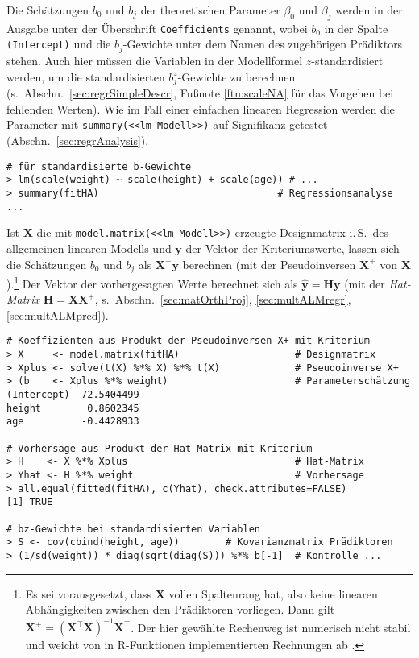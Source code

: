 Die Schätzungen $b_{0}$ und $b_{j}$ der theoretischen Parameter $\beta_{0}$ und $\beta_{j}$ werden in der Ausgabe unter der Überschrift \lstinline!Coefficients! genannt, wobei $b_{0}$ in der Spalte \lstinline!(Intercept)! und die $b_{j}$-Gewichte unter dem Namen des zugehörigen Prädiktors stehen. Auch hier müssen die Variablen in der Modellformel $z$-standardisiert werden, um die standardisierten $b_{j}^{z}$-Gewichte zu berechnen (s.\ Abschn.\ \ref{sec:regrSimpleDescr}, Fußnote \ref{ftn:scaleNA} für das Vorgehen bei fehlenden Werten). Wie im Fall einer einfachen linearen Regression werden die Parameter mit \lstinline!summary(<<lm-Modell>>)! auf Signifikanz getestet (Abschn.\ \ref{sec:regrAnalysis}).
\begin{lstlisting}
# für standardisierte b-Gewichte
> lm(scale(weight) ~ scale(height) + scale(age)) # ...
> summary(fitHA)                               # Regressionsanalyse ...
\end{lstlisting}

Ist $\bm{X}$ die mit \lstinline!model.matrix(<<lm-Modell>>)! erzeugte Designmatrix i.\,S.\ des allgemeinen linearen Modells und $\bm{y}$ der Vektor der Kriteriumswerte, lassen sich die Schätzungen $b_{0}$ und $b_{j}$ als $\bm{X}^{+} \bm{y}$ berechnen (mit der Pseudoinversen $\bm{X}^{+}$ von $\bm{X}$).\footnote{Es sei vorausgesetzt, dass $\bm{X}$ vollen Spaltenrang hat, also keine linearen Abhängigkeiten zwischen den Prädiktoren vorliegen. Dann gilt $\bm{X}^{+} = (\bm{X}^{\top} \bm{X})^{-1} \bm{X}^{\top}$. Der hier gewählte Rechenweg ist numerisch nicht stabil und weicht von in R-Funktionen implementierten Rechnungen ab \cite{Bates2004}.} Der Vektor der vorhergesagten Werte berechnet sich als $\hat{\bm{y}} = \bm{H} \bm{y}$ (mit der \emph{Hat-Matrix} $\bm{H} = \bm{X} \bm{X}^{+}$, s.\ Abschn.\ \ref{sec:matOrthProj}, \ref{sec:multALMregr}, \ref{sec:multALMpred}).
\begin{lstlisting}
# Koeffizienten aus Produkt der Pseudoinversen X+ mit Kriterium
> X     <- model.matrix(fitHA)                    # Designmatrix
> Xplus <- solve(t(X) %*% X) %*% t(X)             # Pseudoinverse X+
> (b    <- Xplus %*% weight)                      # Parameterschätzung
(Intercept) -72.5404499
height        0.8602345
age          -0.4428933

# Vorhersage aus Produkt der Hat-Matrix mit Kriterium
> H    <- X %*% Xplus                             # Hat-Matrix
> Yhat <- H %*% weight                            # Vorhersage
> all.equal(fitted(fitHA), c(Yhat), check.attributes=FALSE)
[1] TRUE

# bz-Gewichte bei standardisierten Variablen
> S <- cov(cbind(height, age))        # Kovarianzmatrix Prädiktoren
> (1/sd(weight)) * diag(sqrt(diag(S))) %*% b[-1]  # Kontrolle ...
\end{lstlisting}

